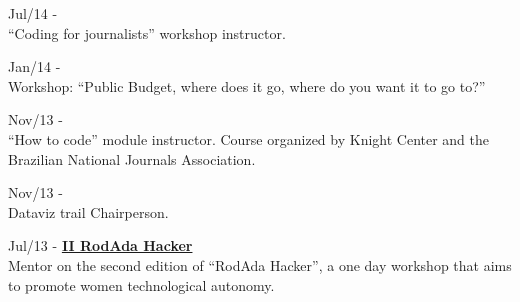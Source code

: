 \documentclass[]{friggeri-cv}
\begin{document}
{\footnotesize{Jul/14}} -{} \href{https://abraji.org.br/congresso/}{\textbf{}}\\
           {``Coding for journalists'' workshop instructor}.

{\footnotesize{Jan/14}} -{} \href{https://www.techtudo.com.br/noticias/noticia/2014/01/cp2014-campus-party-brasil-2014-guia-traz-principais-atividades-por-perfil.html}{\textbf{}}\\
           {Workshop: ``Public Budget, where does it go, where do you want it to go to?''}

{\footnotesize{Nov/13}} -{} \href{https://knightcenter.utexas.edu/pt-br/blog/00-14390-inscricoes-abertas-para-primeiro-curso-da-anj-com-o-centro-knight-introducao-ao-jornal}{\textbf{}}\\
           {``How to code'' module instructor. Course organized by Knight Center and the Brazilian National Journals Association}.

{\footnotesize{Nov/13}} -{} \href{https://web.archive.org/web/20140330181037/https://2.encontro.dados.gov.br/encontro.html}{\textbf{}}\\
           {Dataviz trail Chairperson}.

{\footnotesize{Jul/13}} -{} \href{https://rodadahacker.com/}{\textbf{II RodAda Hacker}}\\
%
           {Mentor on the second edition of ``RodAda Hacker'', a one day workshop that aims to promote women technological autonomy}.
\end{document}
